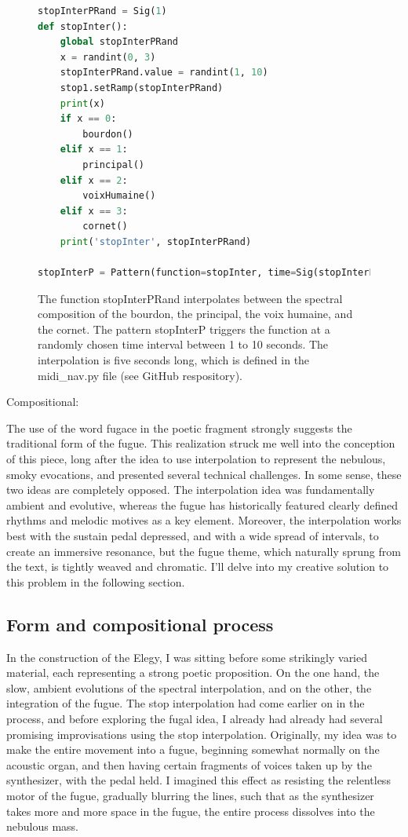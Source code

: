 \documentclass[12pt,twoside,maitrise]{dms_ks}
\theoremstyle{definition}
\begin{document}
\begin{figure}[H]
\begin{lstlisting}[language=Python]
stopInterPRand = Sig(1)
def stopInter():
    global stopInterPRand
    x = randint(0, 3)
    stopInterPRand.value = randint(1, 10)
    stop1.setRamp(stopInterPRand)
    print(x)
    if x == 0:
        bourdon()
    elif x == 1:
        principal()
    elif x == 2:
        voixHumaine()
    elif x == 3:
        cornet()
    print('stopInter', stopInterPRand)

stopInterP = Pattern(function=stopInter, time=Sig(stopInterPRand))
\end{lstlisting}
\caption{The function stopInterPRand interpolates between the spectral composition of the bourdon, the principal, the voix humaine, and the cornet.
The pattern stopInterP triggers the function at a randomly chosen time interval between 1 to 10 seconds.
The interpolation is five seconds long, which is defined in the midi\_nav.py file (see GitHub respository).}
\end{figure}

Compositional:

The use of the word fugace in the poetic fragment strongly suggests the traditional form of the fugue. This realization struck me well into the conception of this piece, long after the idea to use interpolation to represent the nebulous, smoky evocations, and presented several technical challenges. In some sense, these two ideas are completely opposed. The interpolation idea was fundamentally ambient and evolutive, whereas the fugue has historically featured clearly defined rhythms and melodic motives as a key element. Moreover, the interpolation works best with the sustain pedal depressed, and with a wide spread of intervals, to create an immersive resonance, but the fugue theme, which naturally sprung from the text, is tightly weaved and chromatic. I'll delve into my creative solution to this problem in the following section.

\subsection{Form and compositional process}

In the construction of the Elegy, I was sitting before some strikingly varied material, each representing a strong poetic proposition. On the one hand, the slow, ambient evolutions of the spectral interpolation, and on the other, the integration of the fugue. The stop interpolation had come earlier on in the process, and before exploring the fugal idea, I already had already had several promising improvisations using the stop interpolation. Originally, my idea was to make the entire movement into a fugue, beginning somewhat normally on the acoustic organ, and then having certain fragments of voices taken up by the synthesizer, with the pedal held. I imagined this effect as resisting the relentless motor of the fugue, gradually blurring the lines, such that as the synthesizer takes more and more space in the fugue, the entire process dissolves into the nebulous mass.
\end{document}
